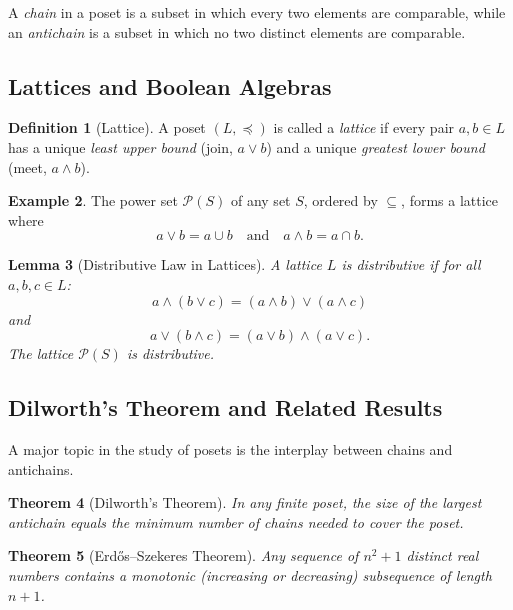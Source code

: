 \documentclass[12pt]{article}
\newtheorem{theorem}{Theorem}[section]
\newtheorem{lemma}[theorem]{Lemma}
\theoremstyle{definition}
\newtheorem{definition}[theorem]{Definition}
\newtheorem{example}[theorem]{Example}
\begin{document}
A \emph{chain} in a poset is a subset in which every two elements are comparable, while an \emph{antichain} is a subset in which no two distinct elements are comparable.

\subsection{Lattices and Boolean Algebras}

\begin{definition}[Lattice]
  A poset \((L, \preceq)\) is called a \emph{lattice} if every pair \(a,b \in L\) has a unique \emph{least upper bound} (join, \(a \vee b\)) and a unique \emph{greatest lower bound} (meet, \(a \wedge b\)).
\end{definition}

\begin{example}
  The power set \(\mathcal{P}(S)\) of any set \(S\), ordered by \(\subseteq\), forms a lattice where
  \[
  a \vee b = a \cup b \quad \text{and} \quad a \wedge b = a \cap b.
  \]
\end{example}

\begin{lemma}[Distributive Law in Lattices]
  A lattice \(L\) is \emph{distributive} if for all \(a,b,c \in L\):
  \[
  a \wedge (b \vee c) = (a \wedge b) \vee (a \wedge c)
  \]
  and
  \[
  a \vee (b \wedge c) = (a \vee b) \wedge (a \vee c).
  \]
  The lattice \(\mathcal{P}(S)\) is distributive.
\end{lemma}

\subsection{Dilworth's Theorem and Related Results}

A major topic in the study of posets is the interplay between chains and antichains.

\begin{theorem}[Dilworth's Theorem]
  In any finite poset, the size of the largest antichain equals the minimum number of chains needed to cover the poset.
\end{theorem}

\begin{theorem}[Erd\H{o}s--Szekeres Theorem]
  Any sequence of \(n^2+1\) distinct real numbers contains a monotonic (increasing or decreasing) subsequence of length \(n+1\).
\end{theorem}
\end{document}
